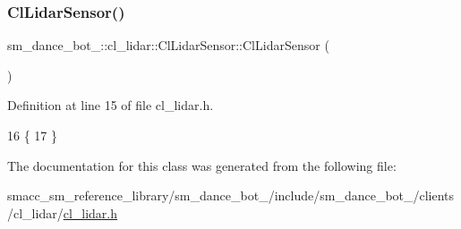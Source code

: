 \subsubsection{\texorpdfstring{Cl\+Lidar\+Sensor()}{ClLidarSensor()}}
{\footnotesize\ttfamily sm\+\_\+dance\+\_\+bot\+\_\+::cl\+\_\+lidar\+::\+Cl\+Lidar\+Sensor\+::\+Cl\+Lidar\+Sensor (\begin{DoxyParamCaption}{ }\end{DoxyParamCaption})\hspace{0.3cm}{\ttfamily [inline]}}



Definition at line 15 of file cl\+\_\+lidar.\+h.


\begin{DoxyCode}
16     \{
17     \}
\end{DoxyCode}


The documentation for this class was generated from the following file\+:\begin{DoxyCompactItemize}
\item 
smacc\+\_\+sm\+\_\+reference\+\_\+library/sm\+\_\+dance\+\_\+bot\+\_/include/sm\+\_\+dance\+\_\+bot\+\_/clients/cl\+\_\+lidar/\hyperlink{sm__dance__bot__2_2include_2sm__dance__bot__2_2clients_2cl__lidar_2cl__lidar_8h}{cl\+\_\+lidar.\+h}\end{DoxyCompactItemize}
